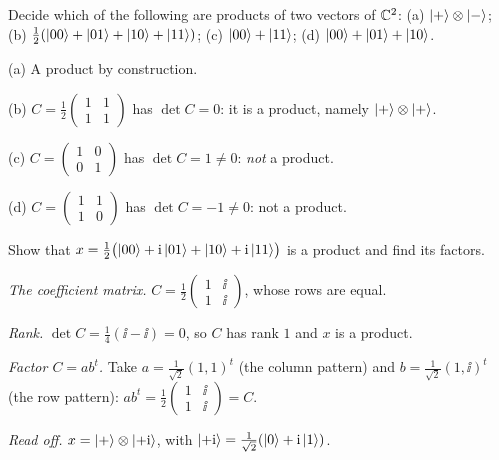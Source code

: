 \begin{example}\label{ex:product-or-not}
  Decide which of the following are products of two vectors of $\mathbb{C}^2$: (a) $\left|+\right\rangle\otimes\left|-\right\rangle$; (b) $\tfrac12(\left|00\right\rangle+\left|01\right\rangle+\left|10\right\rangle+\left|11\right\rangle)$; (c) $\left|00\right\rangle+\left|11\right\rangle$; (d) $\left|00\right\rangle+\left|01\right\rangle+\left|10\right\rangle$.
\end{example}
\begin{solution}
  \begin{steps}
    \item (a) A product by construction.
    \item (b) $C=\tfrac12\begin{pmatrix}1&1\\1&1\end{pmatrix}$ has $\det C=0$: it is a product, namely $\left|+\right\rangle\otimes\left|+\right\rangle$.
    \item (c) $C=\begin{pmatrix}1&0\\0&1\end{pmatrix}$ has $\det C=1\neq0$: \emph{not} a product.
    \item (d) $C=\begin{pmatrix}1&1\\1&0\end{pmatrix}$ has $\det C=-1\neq0$: not a product.
  \end{steps}
\end{solution}

\begin{example}\label{ex:factor}
  Show that $x=\tfrac12\bigl(\left|00\right\rangle+\mathrm{i}\left|01\right\rangle+\left|10\right\rangle+\mathrm{i}\left|11\right\rangle\bigr)$ is a product and find its factors.
\end{example}
\begin{solution}
  \begin{steps}
    \item \emph{The coefficient matrix.} $C=\tfrac12\begin{pmatrix}1&\ii\\1&\ii\end{pmatrix}$, whose rows are equal.
    \item \emph{Rank.} $\det C=\tfrac14(\ii-\ii)=0$, so $C$ has rank $1$ and $x$ is a product.
    \item \emph{Factor $C=ab^t$.} Take $a=\tfrac1{\sqrt2}(1,1)^t$ (the column pattern) and $b=\tfrac1{\sqrt2}(1,\ii)^t$ (the row pattern): $ab^t=\tfrac12\begin{pmatrix}1&\ii\\1&\ii\end{pmatrix}=C$.
    \item \emph{Read off.} $x=\left|+\right\rangle\otimes\left|+\mathrm{i}\right\rangle$, with $\left|+\mathrm{i}\right\rangle=\tfrac1{\sqrt2}(\left|0\right\rangle+\mathrm{i}\left|1\right\rangle)$.
  \end{steps}
\end{solution}

